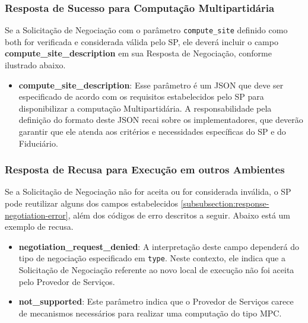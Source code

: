 

\subsubsection{Resposta de Sucesso para Computação Multipartidária}

Se a Solicitação de Negociação com o parâmetro \texttt{compute\_site} definido como both for verificada e considerada válida pelo \acs{SP}, ele deverá incluir o campo \textbf{compute\_site\_description} em sua Resposta de Negociação, conforme ilustrado abaixo.



\begin{itemize}
    \item \textbf{compute\_site\_description}: Esse parâmetro é um \acs{JSON} que deve ser especificado de acordo com os requisitos estabelecidos pelo \acs{SP} para disponibilizar a computação Multipartidária. A responsabilidade pela definição do formato deste \acs{JSON} recai sobre os implementadores, que deverão garantir que ele atenda aos critérios e necessidades específicas do \acs{SP} e do Fiduciário.
\end{itemize}

\subsubsection{Resposta de Recusa para Execução em outros Ambientes}

Se a Solicitação de Negociação não for aceita ou for considerada inválida, o \acs{SP} pode reutilizar alguns dos campos estabelecidos \autoref{subsubsection:response-negotiation-error}, além dos códigos de erro descritos a seguir. Abaixo está um exemplo de recusa.

\begin{itemize}
    \item \textbf{negotiation\_request\_denied}:  A interpretação deste campo dependerá do tipo de negociação especificado em \texttt{type}. Neste contexto, ele indica que a Solicitação de Negociação referente ao novo local de execução não foi aceita pelo Provedor de Serviços.

    \item \textbf{not\_supported}: Este parâmetro indica que o Provedor de Serviços carece de mecanismos necessários para realizar uma computação do tipo \acs{MPC}.
    
\end{itemize}

